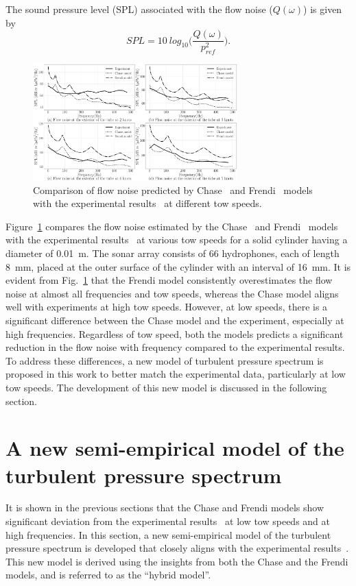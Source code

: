 \documentclass[twocolumn,10pt]{asme2ej}
\begin{document}
The sound pressure level (SPL) associated with the flow noise ($Q(\omega)$) is given by
\begin{equation}\label{SPL outside noise}
SPL = 10~log_{10}\bigg(\frac{Q(\omega)}{p_{ref}^2}\bigg).
\end{equation}
\begin{figure}[h]
    \centering
    \includegraphics[width=3.1in]{figure/Chase ,frendi vs Unni comparison.pdf}
    \caption{Comparison of flow noise predicted by Chase~\cite{Chase1981} and Frendi~\cite{frendi2020} models with the experimental results~\cite{Unni2011} at different tow speeds.}
    \label{Chase,frendi,expt}
\end{figure}

Figure~\ref{Chase,frendi,expt} compares the flow noise estimated by the Chase~\cite{Chase1981} and Frendi~\cite{frendi2020} models with the experimental results~\cite{Unni2011} at various tow speeds for a solid cylinder having a diameter of 0.01~m. The sonar array consists of 66 hydrophones, each of length 8~mm, placed at the outer surface of the cylinder with an interval of 16~mm. It is evident from Fig.~\ref{Chase,frendi,expt} that the Frendi model consistently overestimates the flow noise at almost all frequencies and tow speeds, whereas the Chase model aligns well with experiments at high tow speeds. However, at low speeds, there is a significant difference between the Chase model and the experiment, especially at high frequencies. Regardless of tow speed, both the models predicts a significant reduction in the flow noise with frequency compared to the experimental results. To address these differences, a new model of turbulent pressure spectrum is proposed in this work to better match the experimental data, particularly at low tow speeds. The development of this new model is discussed in the following section.

\section{A new semi-empirical model of the turbulent pressure spectrum}\label{sec:hybmodel}
It is shown in the previous sections that the Chase and Frendi models show significant deviation from the experimental results~\cite{Unni2011} at low tow speeds and at high frequencies. In this section, a new semi-empirical model of the turbulent pressure spectrum is developed that closely aligns with the experimental results~\cite{Unni2011}. This new model is derived using the insights from both the Chase and the Frendi models, and is referred to as the \enquote{hybrid model}.
\end{document}
